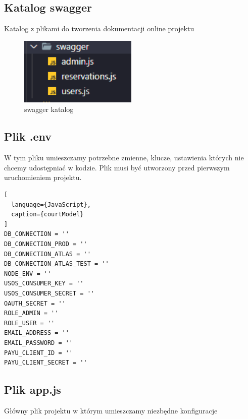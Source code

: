 \documentclass[titlepage]{article}
\begin{document}
\newpage
\subsection{Katalog swagger}
Katalog z plikami do tworzenia dokumentacji online projektu

\begin{figure}[h]
\centering
\includegraphics[width=0.5\textwidth]{swagger.png}
\caption{swagger katalog}
\label{fig:obrazek swagger}
\end{figure}

\subsection{Plik .env}
W tym pliku umieszczamy potrzebne zmienne, klucze, ustawienia których nie chcemy udostępniać w kodzie. Plik musi być utworzony przed pierwszym uruchomieniem projektu.

\begin{lstlisting}[
  language={JavaScript},
  caption={courtModel}
]
DB_CONNECTION = ''
DB_CONNECTION_PROD = ''
DB_CONNECTION_ATLAS = ''
DB_CONNECTION_ATLAS_TEST = ''
NODE_ENV = ''
USOS_CONSUMER_KEY = ''
USOS_CONSUMER_SECRET = ''
OAUTH_SECRET = ''
ROLE_ADMIN = ''
ROLE_USER = ''
EMAIL_ADDRESS = ''
EMAIL_PASSWORD = ''
PAYU_CLIENT_ID = ''
PAYU_CLIENT_SECRET = ''

\end{lstlisting}

\subsection{Plik app.js}
Główny plik projektu w którym umieszczamy niezbędne konfiguracje
\end{document}
